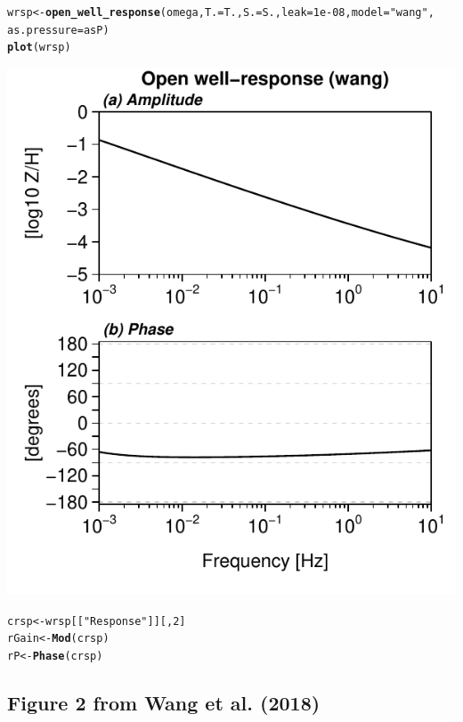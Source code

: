 \documentclass[12pt]{article}\usepackage[]{graphicx}\usepackage[]{color}
\makeatletter
\def\maxwidth{ %
  \ifdim\Gin@nat@width>\linewidth
    \linewidth
  \else
    \Gin@nat@width
  \fi
}
\newcommand{\hlnum}[1]{\textcolor[rgb]{0.686,0.059,0.569}{#1}}%
\newcommand{\hlstr}[1]{\textcolor[rgb]{0.192,0.494,0.8}{#1}}%
\newcommand{\hlstd}[1]{\textcolor[rgb]{0.345,0.345,0.345}{#1}}%
\newcommand{\hlkwb}[1]{\textcolor[rgb]{0.69,0.353,0.396}{#1}}%
\newcommand{\hlkwc}[1]{\textcolor[rgb]{0.333,0.667,0.333}{#1}}%
\newcommand{\hlkwd}[1]{\textcolor[rgb]{0.737,0.353,0.396}{\textbf{#1}}}%
\newenvironment{kframe}{%
 \def\at@end@of@kframe{}%
 \ifinner\ifhmode%
  \def\at@end@of@kframe{\end{minipage}}%
  \begin{minipage}{\columnwidth}%
 \fi\fi%
 \def\FrameCommand##1{\hskip\@totalleftmargin \hskip-\fboxsep
 \colorbox{shadecolor}{##1}\hskip-\fboxsep
     \hskip-\linewidth \hskip-\@totalleftmargin \hskip\columnwidth}%
 \MakeFramed {\advance\hsize-\width
   \@totalleftmargin\z@ \linewidth\hsize
   \@setminipage}}%
 {\par\unskip\endMakeFramed%
 \at@end@of@kframe}
\newenvironment{knitrout}{}{} %
\makeatother
\begin{document}
\begin{knitrout}\small
{}\color{fgcolor}\begin{kframe}
\begin{alltt}
\hlstd{wrsp} \hlkwb{<-} \hlkwd{open_well_response}\hlstd{(omega,} \hlkwc{T.} \hlstd{= T.,} \hlkwc{S.} \hlstd{= S.,} \hlkwc{leak} \hlstd{=} \hlnum{1e-08}\hlstd{,} \hlkwc{model} \hlstd{=} \hlstr{"wang"}\hlstd{,}
    \hlkwc{as.pressure} \hlstd{= asP)}
\hlkwd{plot}\hlstd{(wrsp)}
\end{alltt}
\end{kframe}
\includegraphics[width=\maxwidth]{figure/WANGRESP-1} 
\begin{kframe}\begin{alltt}
\hlstd{crsp} \hlkwb{<-} \hlstd{wrsp[[}\hlstr{"Response"}\hlstd{]][,} \hlnum{2}\hlstd{]}
\hlstd{rGain} \hlkwb{<-} \hlkwd{Mod}\hlstd{(crsp)}
\hlstd{rP} \hlkwb{<-} \hlkwd{Phase}\hlstd{(crsp)}
\end{alltt}
\end{kframe}
\end{knitrout}

\clearpage
\subsection{Figure 2 from Wang et al. (2018)}
\end{document}
